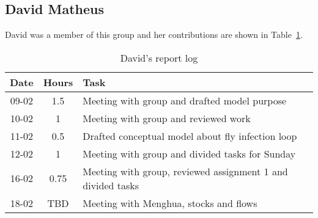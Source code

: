 \subsection{David Matheus}
David was a member of this group and her contributions are shown in Table~\ref{tab:david_log}. 
\begin{longtable}[c]{c|c|m{35em}}
\caption{David's report log}
\label{tab:david_log}\\
\textbf{Date}& \textbf{Hours} & \textbf{Task} \\
\hline
\endfirsthead
%
\endhead
%
09-02   &   1.5     &   Meeting with group and drafted model purpose                                 \\
10-02   &   1       &   Meeting with group and reviewed work                                \\
11-02   &   0.5     &   Drafted conceptual model about fly infection loop               \\
12-02   &   1       &   Meeting with group and divided tasks for Sunday    \\
16-02   &   0.75    &   Meeting with group, reviewed assignment 1 and divided tasks \\
18-02   &   TBD     &   Meeting with Menghua, stocks and flows                      \
\end{longtable}